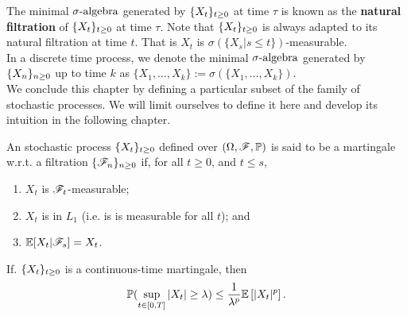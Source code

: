 \documentclass[../TGMAFFIRO.tex]{subfiles}
\begin{document}
The minimal $\sigma\text{-algebra}$ generated by $\{X_t\}_{t\geq 0}$ at time $\tau$ is known as the \textbf{natural filtration} of $\{X_t\}_{t\geq 0}$ at time $\tau$. Note that $\{X_t\}_{t\geq 0}$ is always adapted to its natural filtration at time $t$. That is $X_t$ is $\sigma(\{X_s | s \leq t\})$-measurable.\\

In a discrete time process, we denote the minimal $\sigma\text{-algebra}$ generated by $\{X_n\}_{n\geq 0}$ up to time $k$ as $\{X_1, \ldots, X_k\} := \sigma(\{X_1, \ldots, X_k\})$.\\

We conclude this chapter by defining a particular subset of the family of stochastic processes. We will limit ourselves to define it here and develop its intuition in the following chapter.

\begin{definition}
	An stochastic process $\{X_t\}_{t\geq 0}$ defined over $(\Omega, \mathscr{F}, \mathbb{P})$ is said to be a martingale w.r.t. a filtration $\{\mathscr{F}_n\}_{n\geq 0}$ if, for all $t \geq 0$, and $t \leq s$,
	\begin{enumerate}
		\item $X_t$ is $\mathscr{F}_t$-measurable;
		\item $X_t$ is in $L_1$ (i.e. is is measurable for all $t$); and
		\item $\mathbb{E}[X_t | \mathscr{F}_s] = X_t$.
	\end{enumerate}
\end{definition}

\begin{theorem}\label{th:doob_martingale}
	If. $\{X_t\}_{t\geq 0}$ is a continuous-time martingale, then 
	\begin{equation}
		\mathbb{P}(\sup_{t\in [0, T]} |X_t| \geq \lambda) \leq \frac{1}{\lambda^p}\mathbb{E}\left[|X_t|^p\right].
	\end{equation}
	
\end{theorem}

	
\end{document}
